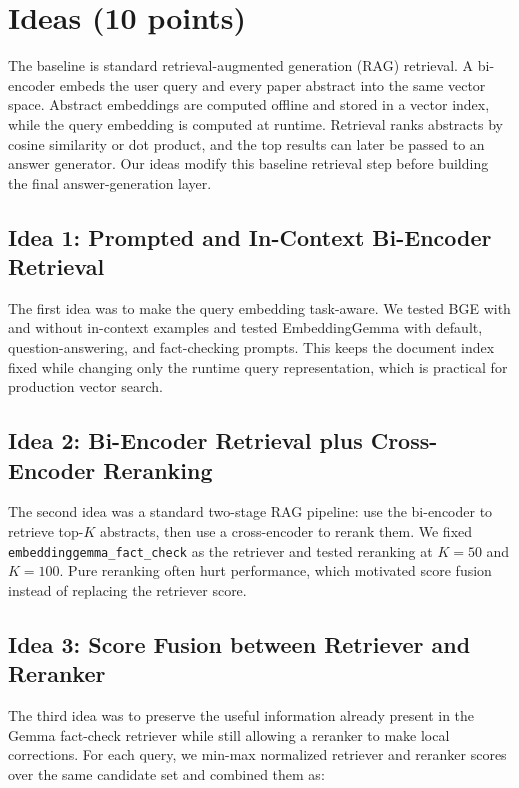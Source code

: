 \documentclass[11pt,a4paper]{article}
\begin{document}
\section{Ideas (10 points)}
The baseline is standard retrieval-augmented generation (RAG) retrieval. A bi-encoder embeds the user query and every paper abstract into the same vector space. Abstract embeddings are computed offline and stored in a vector index, while the query embedding is computed at runtime. Retrieval ranks abstracts by cosine similarity or dot product, and the top results can later be passed to an answer generator. Our ideas modify this baseline retrieval step before building the final answer-generation layer.

\subsection{Idea 1: Prompted and In-Context Bi-Encoder Retrieval}

The first idea was to make the query embedding task-aware. We tested BGE with and without in-context examples and tested EmbeddingGemma with default, question-answering, and fact-checking prompts. This keeps the document index fixed while changing only the runtime query representation, which is practical for production vector search.

\subsection{Idea 2: Bi-Encoder Retrieval plus Cross-Encoder Reranking}

The second idea was a standard two-stage RAG pipeline: use the bi-encoder to retrieve top-$K$ abstracts, then use a cross-encoder to rerank them. We fixed \texttt{embeddinggemma\_fact\_check} as the retriever and tested reranking at $K=50$ and $K=100$. Pure reranking often hurt performance, which motivated score fusion instead of replacing the retriever score.

\subsection{Idea 3: Score Fusion between Retriever and Reranker}

The third idea was to preserve the useful information already present in the Gemma fact-check retriever while still allowing a reranker to make local corrections. For each query, we min-max normalized retriever and reranker scores over the same candidate set and combined them as:
\end{document}
